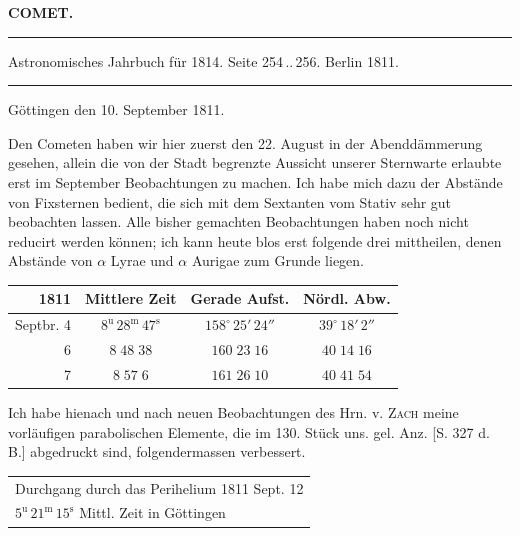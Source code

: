 \clearpage{}\hypertarget{native-338-lower}{}\label{native-338-lower}
\begin{center}\textbf{COMET.}\par\vspace{4pt}\hrule\vspace{4pt}\fontsize{10}{12}\selectfont Astronomisches Jahrbuch für 1814. Seite 254\,..\,256. Berlin 1811.\par\vspace{4pt}\hrule\vspace{4pt}\end{center}


\begin{flushright}Göttingen den 10. September 1811.\end{flushright}
\par\indent Den Cometen haben wir hier zuerst den 22. August in der Abenddämmerung gesehen, allein die von der Stadt begrenzte Aussicht unserer Sternwarte erlaubte erst im September Beobachtungen zu machen. Ich habe mich dazu der Abstände von Fixsternen bedient, die sich mit dem Sextanten vom Stativ sehr gut beobachten lassen. Alle bisher gemachten Beobachtungen haben noch nicht reducirt werden können; ich kann heute blos erst folgende drei mittheilen, denen Abstände von $\alpha$ Lyrae und $\alpha$ Aurigae zum Grunde liegen.
\begin{center}\fontsize{10}{12}\selectfont\setlength{\tabcolsep}{4pt}\renewcommand{\arraystretch}{1.15}\begin{tabular}{r|c|c|c}
1811 & Mittlere Zeit & Gerade Aufst. & Nördl. Abw.\\
\hline
Septbr. 4 & $8^{\mathrm u}\,28^{\mathrm m}\,47^{\mathrm s}$ & $158^\circ\,25'\,24''$ & $39^\circ\,18'\,2''$\\
6 & $8\;48\;38$ & $160\;23\;16$ & $40\;14\;16$\\
7 & $8\;57\;6$ & $161\;26\;10$ & $40\;41\;54$\\
\end{tabular}\end{center}

\par\indent Ich habe hienach und nach neuen Beobachtungen des Hrn. v. \textsc{Zach} meine vorläufigen parabolischen Elemente, die im 130. Stück uns. gel. Anz. [S. 327 d. B.] abgedruckt sind, folgendermassen verbessert.
\begin{center}\fontsize{10}{12}\selectfont\setlength{\tabcolsep}{4pt}\renewcommand{\arraystretch}{1.15}\begin{tabular}{l}
Durchgang durch das Perihelium 1811 Sept. 12\\
\quad $5^{\mathrm u}\,21^{\mathrm m}\,15^{\mathrm s}$ Mittl. Zeit in Göttingen\\
\end{tabular}\end{center}

